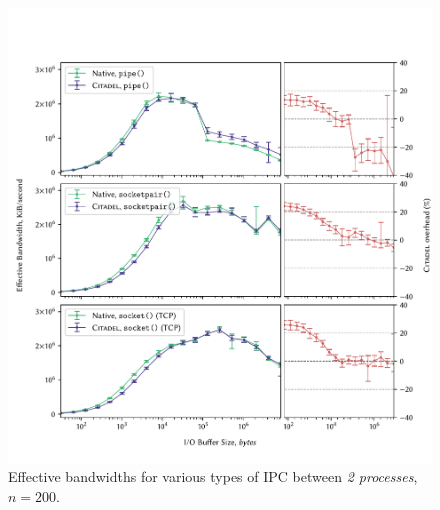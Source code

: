 \begin{figure}[]
    \centering
    \includegraphics[width=\linewidth]{figures/graphs/ipc-2proc.pdf}
    \vspace{-5mm}
    \caption{Effective bandwidths for various types of IPC between \textit{2 processes}, $n=200$.}
    \label{fig:ipc-2proc-graph}
\end{figure}

\clearpage

